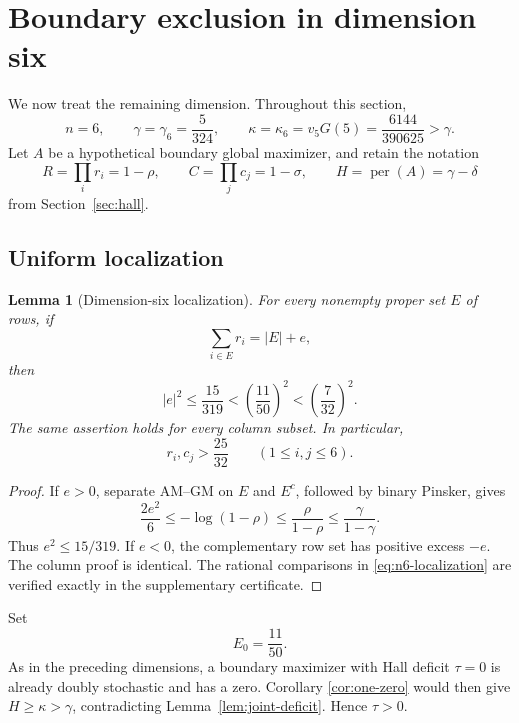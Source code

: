 \documentclass[11pt]{article}
\newtheorem{lemma}[theorem]{Lemma}
\theoremstyle{definition}
\newcommand{\per}{\operatorname{per}}
\newcommand{\1}{\mathbf{1}}
\begin{document}
\section{Boundary exclusion in dimension six}\label{sec:n6}
\setcounter{equation}{0}
\renewcommand{\theequation}{\thesection.\arabic{equation}}
\renewcommand{\theHequation}{n6.\arabic{equation}}

We now treat the remaining dimension.  Throughout this section,
\begin{equation}\label{eq:n6-gamma-kappa}
 n=6,\qquad
 \gamma=\gamma_6=\frac5{324},\qquad
 \kappa=\kappa_6=v_5G(5)=\frac{6144}{390625}>\gamma.
\end{equation}
Let $A$ be a hypothetical boundary global maximizer, and retain the notation
\[
 R=\prod_i r_i=1-\rho,\qquad
 C=\prod_jc_j=1-\sigma,\qquad
 H=\per(A)=\gamma-\delta
\]
from Section~\ref{sec:hall}.

\subsection{Uniform localization}

\begin{lemma}[Dimension-six localization]\label{lem:n6-localization}
For every nonempty proper set $E$ of rows, if
\[
 \sum_{i\in E}r_i=|E|+e,
\]
then
\begin{equation}\label{eq:n6-localization}
 |e|^2\le\frac{15}{319}
 <\left(\frac{11}{50}\right)^2
 <\left(\frac7{32}\right)^2.
\end{equation}
The same assertion holds for every column subset.  In particular,
\begin{equation}\label{eq:n6-singleton-lower}
 r_i,c_j>\frac{25}{32}\qquad(1\le i,j\le6).
\end{equation}
\end{lemma}

\begin{proof}
If $e>0$, separate AM--GM on $E$ and $E^c$, followed by binary Pinsker,
gives
\[
 \frac{2e^2}{6}\le-\log(1-\rho)
 \le\frac{\rho}{1-\rho}
 \le\frac{\gamma}{1-\gamma}.
\]
Thus $e^2\le15/319$.  If $e<0$, the complementary row set has positive
excess $-e$.  The column proof is identical.  The rational comparisons in
\eqref{eq:n6-localization} are verified exactly in the supplementary
certificate.
\end{proof}

Set
\begin{equation}\label{eq:n6-E0}
 E_0=\frac{11}{50}.
\end{equation}
As in the preceding dimensions, a boundary maximizer with Hall deficit
$\tau=0$ is already doubly stochastic and has a zero.  Corollary
\ref{cor:one-zero} would then give $H\ge\kappa>\gamma$, contradicting
Lemma~\ref{lem:joint-deficit}.  Hence $\tau>0$.
\end{document}
